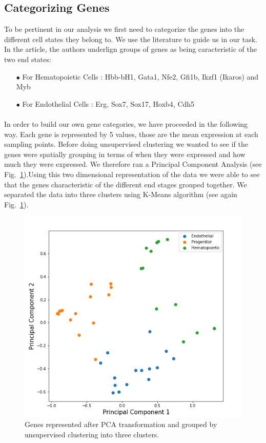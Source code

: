\documentclass[a4paper,12pt]{book}
\theoremstyle{break}
\begin{document}
\subsection*{Categorizing Genes}
	 To be pertinent in our analysis we first need to categorize the genes into the different cell states they belong to. We use the literature to guide us in our task. In the article, the authors underlign groups of genes as being caracteristic of the two end states:
	\begin{itemize}
		\item[$\bullet$] For Hematopoietic Cells : Hbb-bH1, Gata1, Nfe2, Gfi1b, Ikzf1 (Ikaros) and Myb
		\item[$\bullet$] For Endothelial Cells : Erg, Sox7, Sox17, Hoxb4, Cdh5
	\end{itemize}
	\paragraph{}
	In order to build our own gene categories, we have proceeded in the following way. Each gene is represented by 5 values, those are the mean expression at each sampling points. Before doing unsupervised clustering we wanted to see if the genes were spatially grouping in terms of when they were expressed and how much they were expressed. We therefore ran a Principal Component Analysis (see Fig.~\ref{fig:genePCA}).Using this two dimensional representation of the data we were able to see that the genes characteristic of the different end stages grouped together. We separated the data into three clusters using K-Means algorithm (see again Fig.~\ref{fig:genePCA}).\\
	\begin{figure}[h!]
		\centering
		\includegraphics[height = 0.4\textheight]{../Preliminary/genepca.png}
		\caption{Genes represented after PCA transformation and grouped by unsupervised clustering into three clusters.}
		\label{fig:genePCA}
	\end{figure}
\end{document}
